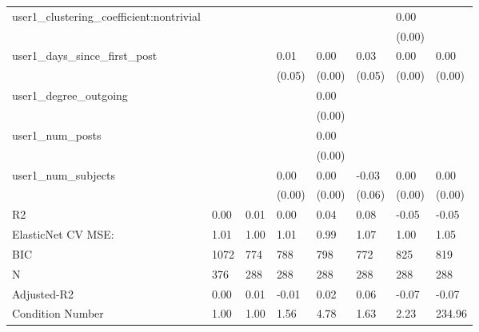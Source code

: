 \begin{table}
\begin{center}
\begin{tabular}{llllllll}
user1_clustering_coefficient:nontrivial        &          &            &         &         &          & 0.00               &         \\
                                               &          &            &         &         &          & (0.00)             &         \\
user1_days_since_first_post                    &          &            & 0.01    & 0.00    & 0.03     & 0.00               & 0.00    \\
                                               &          &            & (0.05)  & (0.00)  & (0.05)   & (0.00)             & (0.00)  \\
user1_degree_outgoing                          &          &            &         & 0.00    &          &                    &         \\
                                               &          &            &         & (0.00)  &          &                    &         \\
user1_num_posts                                &          &            &         & 0.00    &          &                    &         \\
                                               &          &            &         & (0.00)  &          &                    &         \\
user1_num_subjects                             &          &            & 0.00    & 0.00    & -0.03    & 0.00               & 0.00    \\
                                               &          &            & (0.00)  & (0.00)  & (0.06)   & (0.00)             & (0.00)  \\
R2                                             & 0.00     & 0.01       & 0.00    & 0.04    & 0.08     & -0.05              & -0.05   \\
ElasticNet CV MSE:                             & 1.01     & 1.00       & 1.01    & 0.99    & 1.07     & 1.00               & 1.05    \\
BIC                                            & 1072     & 774        & 788     & 798     & 772      & 825                & 819     \\
N                                              & 376      & 288        & 288     & 288     & 288      & 288                & 288     \\
Adjusted-R2                                    & 0.00     & 0.01       & -0.01   & 0.02    & 0.06     & -0.07              & -0.07   \\
Condition Number                               & 1.00     & 1.00       & 1.56    & 4.78    & 1.63     & 2.23               & 234.96  \\
\hline
\end{tabular}
\end{center}
\end{table}